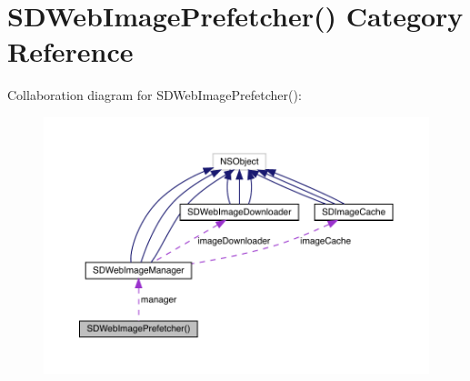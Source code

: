 \hypertarget{category_s_d_web_image_prefetcher_07_08}{}\section{S\+D\+Web\+Image\+Prefetcher() Category Reference}
\label{category_s_d_web_image_prefetcher_07_08}


Collaboration diagram for S\+D\+Web\+Image\+Prefetcher()\+:\nopagebreak
\begin{figure}[H]
\begin{center}
\leavevmode
\includegraphics[width=350pt]{category_s_d_web_image_prefetcher_07_08__coll__graph}
\end{center}
\end{figure}
